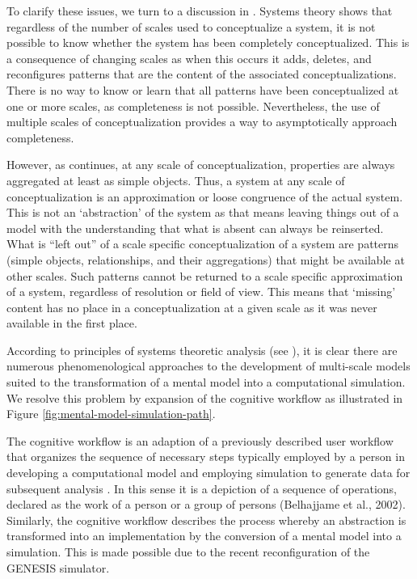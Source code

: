 \documentclass[11pt,3p,twocolumn]{JMN}
\begin{document}
To clarify these issues, we turn to a discussion in \cite{Heylighen:2006vn}. Systems theory shows that regardless of the number of scales used to conceptualize a system, it is not possible to know whether the system has been completely conceptualized. This is a consequence of changing scales as when this occurs it adds, deletes, and reconfigures patterns that are the content of the associated conceptualizations. There is no way to know or learn that all patterns have been conceptualized at one or more scales, as completeness is not possible. Nevertheless, the use of multiple scales of conceptualization provides a way to asymptotically approach completeness.
 
However, as \citet{Heylighen:2006vn} continues, at any scale of conceptualization, properties are always aggregated at least as simple objects. Thus, a system at any scale of conceptualization is an approximation or loose congruence of the actual system. This is not an `abstraction' of the system as that means leaving things out of a model with the understanding that what is absent can always be reinserted. What is ``left out'' of a scale specific conceptualization of a system are patterns (simple objects, relationships, and their aggregations) that might be available at other scales. Such patterns cannot be returned to a scale specific approximation of a system, regardless of resolution or field of view. This means that `missing' content has no place in a conceptualization at a given scale as it was never available in the first place.

According to principles of systems theoretic analysis (see \cite{Bertalanffy:1973zr,Heylighen:2006vn}), it is clear there are numerous phenomenological approaches to the development of multi-scale models suited to the transformation of a mental model into a computational simulation. We resolve this problem by expansion of the cognitive workflow as illustrated in Figure \ref{fig:mental-model-simulation-path}.

The cognitive workflow is an adaption of a previously described user workflow that organizes the sequence of necessary steps typically employed by a person in developing a computational model and employing simulation to generate data for subsequent analysis \cite{cornelis12}. In this sense it is a depiction of a sequence of operations, declared as the work of a person or a group of persons (Belhajjame et al., 2002). Similarly, the cognitive workflow describes the process whereby an abstraction is transformed into an implementation by the conversion of a mental model into a simulation. This is made possible due to the recent reconfiguration of the GENESIS simulator. 
\end{document}
